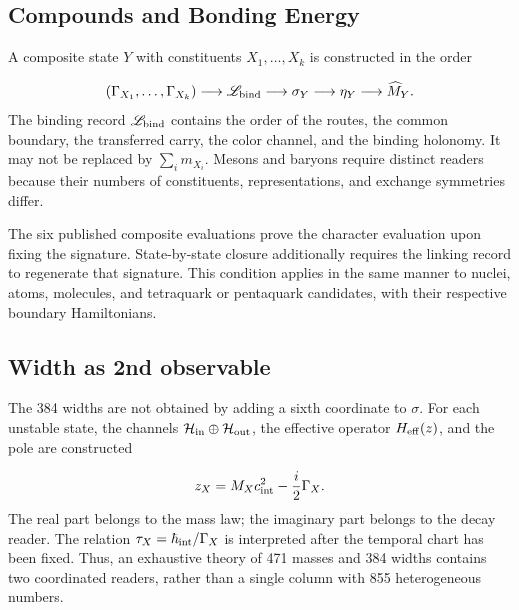 \subsection{Compounds and Bonding Energy}
A composite state \(Y\) with constituents \(X_1,\ldots,X_k\) is constructed in the order

\[
(\Gamma_{X_1},\ldots,\Gamma_{X_k})
\longrightarrow
\mathscr L_{\rm bind}
\longrightarrow
\sigma_Y
\longrightarrow
\eta_Y
\longrightarrow
\widehat M_Y.
\]
The binding record \(\mathscr L_{\rm bind}\) contains the order of the routes, the common boundary, the transferred carry, the color channel, and the binding holonomy. It may not be replaced by \(\sum_i m_{X_i}\). Mesons and baryons require distinct readers because their numbers of constituents, representations, and exchange symmetries differ.

The six published composite evaluations prove the character evaluation upon fixing the signature. State-by-state closure additionally requires the linking record to regenerate that signature. This condition applies in the same manner to nuclei, atoms, molecules, and tetraquark or pentaquark candidates, with their respective boundary Hamiltonians.

\subsection{Width as 2nd observable}
The 384 widths are not obtained by adding a sixth coordinate to \(\sigma\). For each unstable state, the channels \(\mathcal H_{\rm in}\oplus\mathcal H_{\rm out}\), the effective operator \(H_{\rm eff}(z)\), and the pole are constructed

\[
z_X=M_Xc_{\rm int}^{2}-\frac{i}{2}\Gamma_X.
\]
The real part belongs to the mass law; the imaginary part belongs to the decay reader. The relation \(\tau_X=\hbar_{\rm int}/\Gamma_X\) is interpreted after the temporal chart has been fixed. Thus, an exhaustive theory of 471 masses and 384 widths contains two coordinated readers, rather than a single column with 855 heterogeneous numbers.

